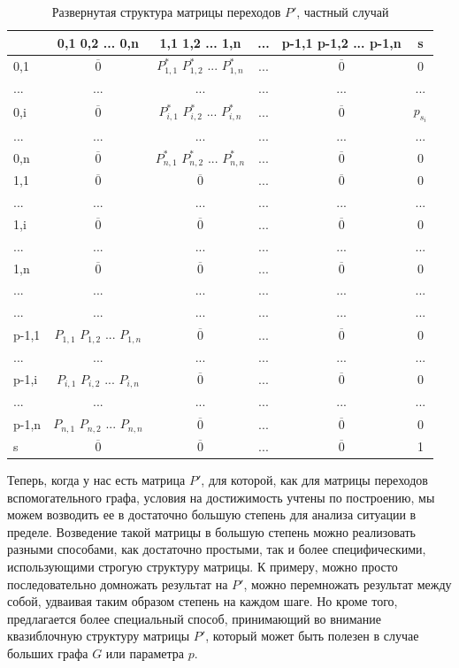 \begin{table}[h]
	\begin{tabular}{l || c | c | c | c | c}
		& 0,1 0,2 ... 0,n & 1,1 1,2 ... 1,n & ... & p-1,1 p-1,2 ... p-1,n & s \\
		\hline \hline
		0,1 & $\overline 0$ & $P^*_{1,1}$ $P^*_{1,2}$ ... $P^*_{1,n}$ & ... & $\overline 0$ & 0 \\
		... & ... & ... & ... & ... & ... \\
		0,i & $\overline 0$ & $P^*_{i,1}$ $P^*_{i,2}$ ... $P^*_{i,n}$ & ... & $\overline 0$ & $p_{s_i}$ \\
		... & ... & ... & ... & ... & ... \\
		0,n & $\overline 0$ & $P^*_{n,1}$ $P^*_{n,2}$ ... $P^*_{n,n}$ & ... & $\overline 0$ & 0 \\
		\hline \hline
		1,1 & $\overline 0$ & $\overline 0$ & ... & $\overline 0$ & 0 \\
		... & ... & ... & ... & ... & ... \\
		1,i & $\overline 0$ & $\overline 0$ & ... & $\overline 0$ & 0 \\
		... & ... & ... & ... & ... & ... \\
		1,n & $\overline 0$ & $\overline 0$ & ... & $\overline 0$ & 0 \\
		\hline \hline
		... & ... & ... & ... & ... & ... \\
		... & ... & ... & ... & ... & ... \\
		\hline \hline
		p-1,1  & $P_{1,1}$ $P_{1,2}$ ... $P_{1,n}$ & $\overline 0$ & ... & $\overline 0$ & 0 \\
		... & ... & ... & ... & ... & ... \\
		p-1,i & $P_{i,1}$ $P_{i,2}$ ... $P_{i,n}$ & $\overline 0$ & ... & $\overline 0$ & 0 \\
		... & ... & ... & ... & ... & ... \\
		p-1,n & $P_{n,1}$ $P_{n,2}$ ... $P_{n,n}$ & $\overline 0$ & ... & $\overline 0$ & 0 \\
		\hline \hline
		s  & $\overline 0$ & $\overline 0$ & ... & $\overline 0$ & 1 \\
	\end{tabular}
	\caption{Развернутая структура матрицы переходов $P'$, частный случай}
	\label{tabl:P'}
\end{table}

Теперь, когда у нас есть матрица $P'$, для которой, как для матрицы переходов вспомогательного графа, условия на достижимость учтены по построению, мы можем возводить ее в достаточно большую степень для анализа ситуации в пределе. Возведение такой матрицы в большую степень можно реализовать разными способами, как достаточно простыми, так и более специфическими, использующими строгую структуру матрицы. К примеру, можно просто последовательно домножать результат на $P'$, можно перемножать результат между собой, удваивая таким образом степень на каждом шаге. Но кроме того, предлагается более специальный способ, принимающий во внимание квазиблочную структуру матрицы $P'$, который может быть полезен в случае больших графа $G$ или параметра $p$.	

